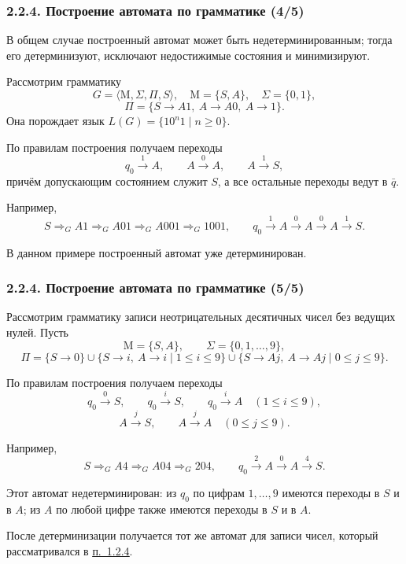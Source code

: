 \documentclass[mathserif,12pt,aspectratio=169]{beamer}
\let\le\leqslant
\let\ge\geqslant
\def\DMref#1#2{{\color{blue}\underline{\hyperlink{#2}{#1}}}}
\begin{document}
\begin{frame}
\frametitle{2.2.4. Построение автомата по грамматике (4/5)}
\small

\begin{remark}
В общем случае построенный автомат может быть недетерминированным;
тогда его детерминизуют, исключают недостижимые состояния и минимизируют.
\end{remark}

\begin{example}
Рассмотрим грамматику
\[
G=\langle \mathrm{M},\Sigma,\Pi,S\rangle,\quad
\mathrm{M}=\{S,A\},\quad
\Sigma=\{0,1\},
\]
\[
\Pi=\{S\to A1,\ A\to A0,\ A\to 1\}.
\]
Она порождает язык \(L(G)=\{10^n1\mid n\ge 0\}\).

По правилам построения получаем переходы
\[
q_0\xrightarrow{1}A,\qquad
A\xrightarrow{0}A,\qquad
A\xrightarrow{1}S,
\]
причём допускающим состоянием служит \(S\), а все остальные переходы ведут в \(\bar q\).

Например,
\[
S\Rightarrow_G A1\Rightarrow_G A01\Rightarrow_G A001\Rightarrow_G 1001,
\qquad
q_0\xrightarrow{1}A\xrightarrow{0}A\xrightarrow{0}A\xrightarrow{1}S.
\]
\end{example}

\begin{remark}
В данном примере построенный автомат уже детерминирован.
\end{remark}

\end{frame}

\begin{frame}
\frametitle{2.2.4. Построение автомата по грамматике (5/5)}
\small

\begin{example}
Рассмотрим грамматику записи неотрицательных десятичных чисел
без ведущих нулей. Пусть
\[
\mathrm{M}=\{S,A\},
\qquad
\Sigma=\{0,1,\dots,9\},
\]
\[
\Pi=\{S\to 0\}\cup
\{S\to i,\ A\to i\mid 1\le i\le 9\}\cup
\{S\to Aj,\ A\to Aj\mid 0\le j\le 9\}.
\]

По правилам построения получаем переходы
\[
q_0\xrightarrow{0}S,\qquad
q_0\xrightarrow{i}S,\qquad
q_0\xrightarrow{i}A
\quad (1\le i\le 9),
\]
\[
A\xrightarrow{j}S,\qquad
A\xrightarrow{j}A
\quad (0\le j\le 9).
\]

Например,
\[
S\Rightarrow_G A4\Rightarrow_G A04\Rightarrow_G 204,
\qquad
q_0\xrightarrow{2}A\xrightarrow{0}A\xrightarrow{4}S.
\]

Этот автомат недетерминирован:
из \(q_0\) по цифрам \(1,\dots,9\) имеются переходы в \(S\) и в \(A\);
из \(A\) по любой цифре также имеются переходы в \(S\) и в \(A\).
\end{example}

\begin{remark}
После детерминизации получается тот же автомат для записи чисел,
который рассматривался в \DMref{п.~1.2.4}{1.2.4.}.
\end{remark}

\end{frame}
\end{document}
